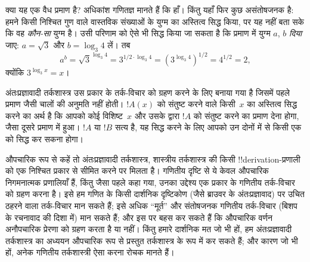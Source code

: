 \documentclass[../../../include/open-logic-chapter]{subfiles}
\begin{document}
क्या यह एक वैध प्रमाण है? अधिकांश गणितज्ञ मानते हैं कि हाँ। किंतु यहाँ फिर
कुछ असंतोषजनक है: हमने किसी निश्चित गुण वाले वास्तविक संख्याओं के युग्म का
अस्तित्व सिद्ध किया, पर यह नहीं बता सके कि वह \emph{कौन-सा} युग्म है। उसी
परिणाम को ऐसे भी सिद्ध किया जा सकता है कि प्रमाण में युग्म $a$, $b$
\emph{दिया} जाए: $a = \sqrt{3}$ और $b = \log_3 4$ लें। तब
\[
a^b = \sqrt{3}^{\log_3 4} = 3^{1/2 \cdot \log_3 4} = (3^{\log_3
  4})^{1/2} = 4^{1/2}= 2,
\]
क्योंकि $3^{\log_3 x} = x$।

अंतःप्रज्ञावादी तर्कशास्त्र उस प्रकार के तर्क-विचार को ग्रहण करने के लिए
बनाया गया है जिसमें पहले प्रमाण जैसी चालों की अनुमति नहीं होती। $!A(x)$ को
संतुष्ट करने वाले किसी~$x$ का अस्तित्व सिद्ध करने का अर्थ है कि आपको कोई
विशिष्ट~$x$ और उसके द्वारा $!A$ को संतुष्ट करने का प्रमाण देना होगा, जैसा
दूसरे प्रमाण में हुआ। $!A$ या $!B$ सत्य है, यह सिद्ध करने के लिए आपको उन
दोनों में से किसी एक को सिद्ध कर सकना होगा।

औपचारिक रूप से कहें तो अंतःप्रज्ञावादी तर्कशास्त्र, शास्त्रीय तर्कशास्त्र की
किसी !!{derivation}-प्रणाली को एक निश्चित प्रकार से सीमित करने पर मिलता
है। गणितीय दृष्टि से ये केवल औपचारिक निगमनात्मक प्रणालियाँ हैं, किंतु जैसा
पहले कहा गया, उनका उद्देश्य एक प्रकार के गणितीय तर्क-विचार को ग्रहण करना
है। इसे हम गणित के किसी दार्शनिक दृष्टिकोण (जैसे ब्राउवर के अंतःप्रज्ञावाद)
पर उचित ठहरने वाला तर्क-विचार मान सकते हैं; इसे अधिक ``मूर्त'' और संतोषजनक
गणितीय तर्क-विचार (बिशप के रचनावाद की दिशा में) मान सकते हैं; और इस पर
बहस कर सकते हैं कि औपचारिक वर्णन अनौपचारिक प्रेरणा को ग्रहण करता है या नहीं।
किंतु हमारे दार्शनिक मत जो भी हों, हम अंतःप्रज्ञावादी तर्कशास्त्र का अध्ययन
औपचारिक रूप से प्रस्तुत तर्कशास्त्र के रूप में कर सकते हैं; और कारण जो भी
हों, अनेक गणितीय तर्कशास्त्री ऐसा करना रोचक मानते हैं।
\end{document}
